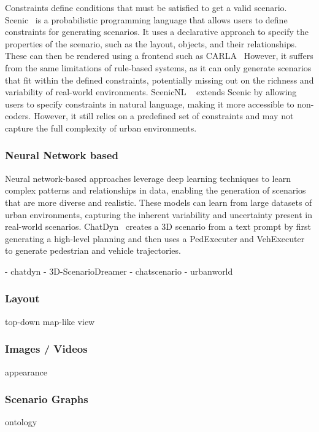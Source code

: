 \documentclass{article}
\begin{document}
Constraints define conditions that must be satisfied to get a valid scenario. Scenic~\cite{fremont2019scenic} is a probabilistic programming language that allows users to define constraints for generating scenarios. It uses a declarative approach to specify the properties of the scenario, such as the layout, objects, and their relationships. These can then be rendered using a frontend such as CARLA~\cite{dosovitskiy2017carla} However, it suffers from the same limitations of rule-based systems, as it can only generate scenarios that fit within the defined constraints, potentially missing out on the richness and variability of real-world environments. ScenicNL ~\cite{elmaaroufi2024scenicnl} extends Scenic by allowing users to specify constraints in natural language, making it more accessible to non-coders. However, it still relies on a predefined set of constraints and may not capture the full complexity of urban environments. 

\subsubsection{Neural Network based}

Neural network-based approaches leverage deep learning techniques to learn complex patterns and relationships in data, enabling the generation of scenarios that are more diverse and realistic. These models can learn from large datasets of urban environments, capturing the inherent variability and uncertainty present in real-world scenarios. ChatDyn~\cite{wei2024chatdyn} creates a 3D scenario from a text prompt by first generating a high-level planning and then uses a PedExecuter and VehExecuter to generate pedestrian and vehicle trajectories. 

- chatdyn
- 3D-ScenarioDreamer
- chatscenario
- urbanworld

\subsubsection{Layout}
top-down map-like view

\subsubsection{Images / Videos}
appearance

\subsubsection{Scenario Graphs}
ontology
\end{document}
